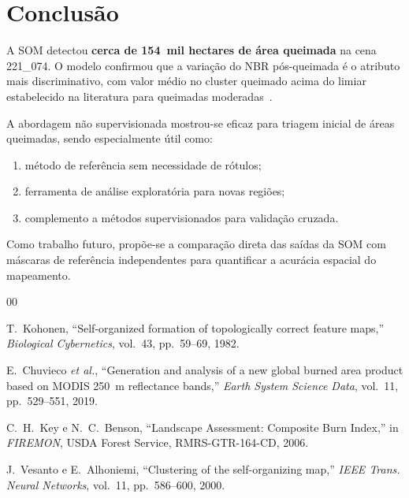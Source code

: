 \documentclass[conference]{IEEEtran}
\begin{document}
\section{Conclusão}

A SOM detectou \textbf{cerca de 154~mil hectares de área queimada} na cena
221\_074. O modelo confirmou que a variação do NBR pós-queimada é o atributo
mais discriminativo, com valor médio no cluster queimado acima do limiar
estabelecido na literatura para queimadas moderadas~\cite{b3}.

A abordagem não supervisionada mostrou-se eficaz para triagem inicial de
áreas queimadas, sendo especialmente útil como:

\begin{enumerate}
  \item método de referência sem necessidade de rótulos;
  \item ferramenta de análise exploratória para novas regiões;
  \item complemento a métodos supervisionados para validação cruzada.
\end{enumerate}

Como trabalho futuro, propõe-se a comparação direta das saídas da SOM com
máscaras de referência independentes para quantificar a acurácia espacial
do mapeamento.

\begin{thebibliography}{00}

T.~Kohonen,
``Self-organized formation of topologically correct feature maps,''
\textit{Biological Cybernetics}, vol.~43, pp.~59--69, 1982.

E.~Chuvieco \textit{et al.},
``Generation and analysis of a new global burned area product based on
MODIS 250~m reflectance bands,''
\textit{Earth System Science Data}, vol.~11, pp.~529--551, 2019.

C.~H.~Key e N.~C.~Benson,
``Landscape Assessment: Composite Burn Index,''
in \textit{FIREMON}, USDA Forest Service, RMRS-GTR-164-CD, 2006.

J.~Vesanto e E.~Alhoniemi,
``Clustering of the self-organizing map,''
\textit{IEEE Trans. Neural Networks}, vol.~11, pp.~586--600, 2000.

\end{thebibliography}
\end{document}
